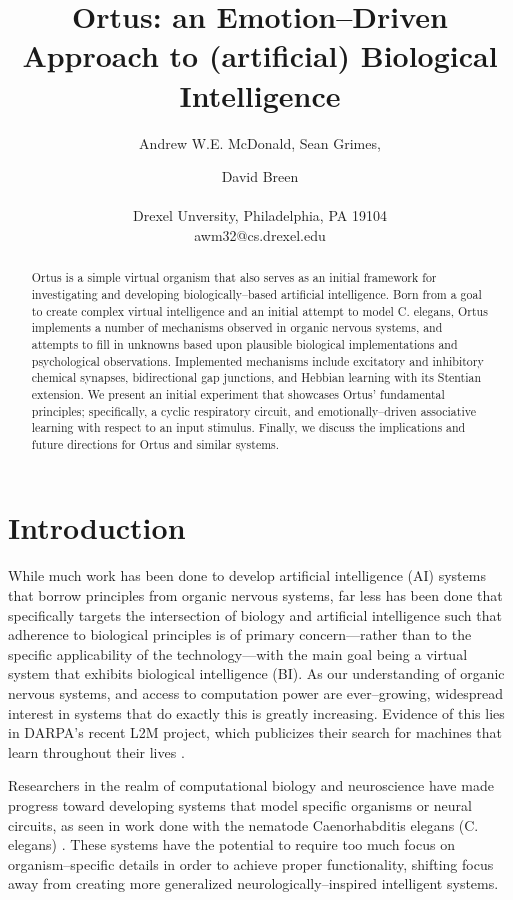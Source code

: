 \documentclass[letterpaper]{article}
\title{Ortus: an Emotion--Driven Approach to (artificial) Biological Intelligence}
\author{Andrew W.E. McDonald, Sean Grimes,\and David Breen \\
\mbox{}\\
Drexel Unversity, Philadelphia, PA 19104 \\
awm32@cs.drexel.edu} %
\begin{document}
\maketitle

\begin{abstract}
 Ortus is a simple virtual organism that also serves as an initial framework for investigating and developing biologically--based artificial intelligence. Born from a goal to create complex virtual intelligence and an initial attempt to model C. elegans, Ortus implements a number of mechanisms observed in organic nervous systems, and attempts to fill in unknowns based upon plausible biological implementations and psychological observations. Implemented mechanisms include excitatory and inhibitory chemical synapses, bidirectional gap junctions, and Hebbian learning with its Stentian extension.  We present an initial experiment that showcases Ortus' fundamental principles; specifically, a cyclic respiratory circuit, and emotionally--driven associative learning with respect to an input stimulus. Finally, we discuss the implications and future directions for Ortus and similar systems.


\end{abstract}

\section{Introduction}


While much work has been done to develop artificial intelligence (AI) systems that borrow principles from organic nervous systems, far less has been done that specifically targets the intersection of biology and artificial intelligence such that adherence to biological principles is of primary concern---rather than to the specific applicability of the technology---with the main goal being a virtual system that exhibits biological intelligence (BI).
As our understanding of organic nervous systems, and access to computation power are ever--growing, widespread interest in systems that do exactly this is greatly increasing. Evidence of this lies in DARPA's recent L2M project, which publicizes their search for machines that learn throughout their lives \citep{darpa}.

Researchers in the realm of computational biology and neuroscience have made progress toward developing systems that model specific organisms or neural circuits, as seen in work done with the nematode Caenorhabditis elegans (C. elegans) \citep{Izquierdo2016}. These systems have the potential to require too much focus on organism--specific details in order to achieve proper functionality, shifting focus away from creating more generalized neurologically--inspired intelligent systems.
\end{document}
